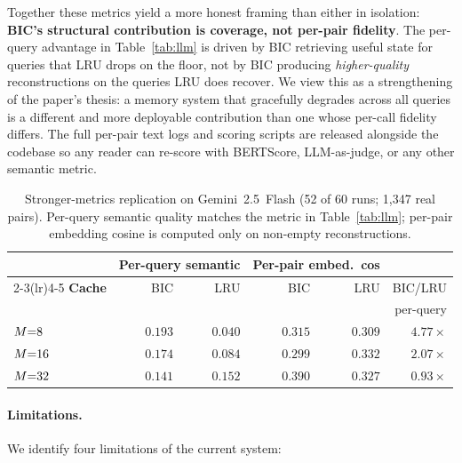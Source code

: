 Together these metrics yield a more honest framing than either in
isolation: \textbf{BIC's structural contribution is coverage, not
per-pair fidelity}. The per-query advantage in
Table~\ref{tab:llm} is driven by BIC retrieving useful state for
queries that LRU drops on the floor, not by BIC producing
\emph{higher-quality} reconstructions on the queries LRU does
recover. We view this as a strengthening of the paper's thesis: a
memory system that gracefully degrades across all queries is a
different and more deployable contribution than one whose per-call
fidelity differs. The full per-pair text logs and scoring scripts
are released alongside the codebase so any reader can re-score with
BERTScore, LLM-as-judge, or any other semantic metric.

\begin{table}[t]
\centering
\caption{Stronger-metrics replication on Gemini~2.5~Flash (52 of 60 runs; 1{,}347 real pairs). Per-query semantic quality matches the metric in Table~\ref{tab:llm}; per-pair embedding cosine is computed only on non-empty reconstructions.}
\label{tab:stronger-metrics}
\small
\setlength{\tabcolsep}{4pt}
\begin{tabular}{lrrrrr}
\toprule
 & \multicolumn{2}{c}{\textbf{Per-query semantic}} & \multicolumn{2}{c}{\textbf{Per-pair embed.\ cos}} & \\
\cmidrule(lr){2-3}\cmidrule(lr){4-5}
\textbf{Cache} & BIC & LRU & BIC & LRU & BIC/LRU \\
 & & & & & per-query \\
\midrule
$M{=}8$  & $0.193$ & $0.040$ & $0.315$ & $0.309$ & $4.77\times$ \\
$M{=}16$ & $0.174$ & $0.084$ & $0.299$ & $0.332$ & $2.07\times$ \\
$M{=}32$ & $0.141$ & $0.152$ & $0.390$ & $0.327$ & $0.93\times$ \\
\bottomrule
\end{tabular}
\end{table}

\paragraph{Limitations.}
We identify four limitations of the current system:

